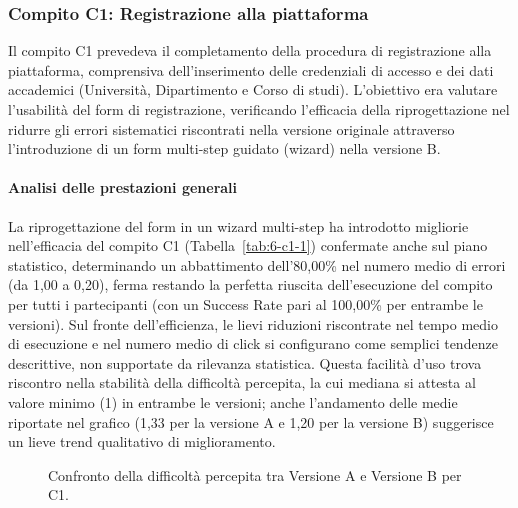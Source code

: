 \subsubsection{Compito C1: Registrazione alla piattaforma}

Il compito C1 prevedeva il completamento della procedura di registrazione alla piattaforma, comprensiva dell’inserimento delle credenziali di accesso e dei dati accademici (Università, Dipartimento e Corso di studi). L’obiettivo era valutare l’usabilità del form di registrazione, verificando l’efficacia della riprogettazione nel ridurre gli errori sistematici riscontrati nella versione originale attraverso l’introduzione di un form multi-step guidato (wizard) nella versione B.

\paragraph{Analisi delle prestazioni generali}

La riprogettazione del form in un wizard multi-step ha introdotto migliorie nell'efficacia del compito C1 (Tabella~\ref{tab:6-c1-1}) confermate anche sul piano statistico, determinando un abbattimento dell'80,00\% nel numero medio di errori (da 1,00 a 0,20), ferma restando la perfetta riuscita dell'esecuzione del compito per tutti i partecipanti (con un Success Rate pari al 100,00\% per entrambe le versioni). Sul fronte dell'efficienza, le lievi riduzioni riscontrate nel tempo medio di esecuzione e nel numero medio di click si configurano come semplici tendenze descrittive, non supportate da rilevanza statistica. Questa facilità d'uso trova riscontro nella stabilità della difficoltà percepita, la cui mediana si attesta al valore minimo (1) in entrambe le versioni; anche l'andamento delle medie riportate nel grafico (1,33 per la versione A e 1,20 per la versione B) suggerisce un lieve trend qualitativo di miglioramento.

\begin{figure}[H]
	\centering
	\caption{Confronto della difficoltà percepita tra Versione A e Versione B per C1.}
	\label{fig:6-c1-1}
\end{figure}

